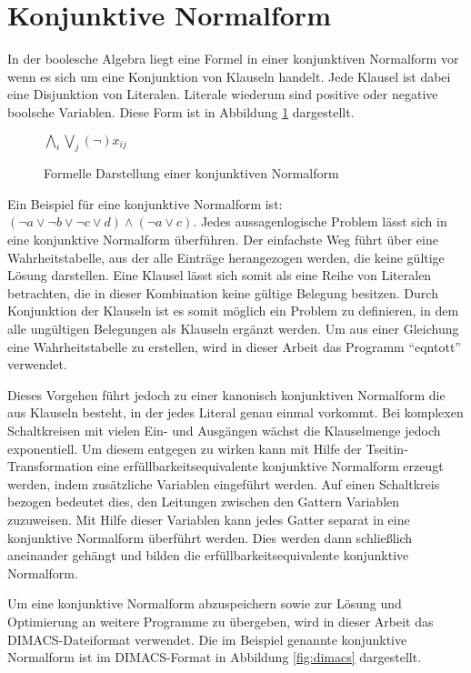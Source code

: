 \section{Konjunktive Normalform}
\label{sec:knf}


In der boolesche Algebra liegt eine Formel in einer konjunktiven Normalform vor wenn es sich um eine Konjunktion von Klauseln handelt.
Jede Klausel ist dabei eine Disjunktion von Literalen. Literale wiederum sind positive oder negative boolsche Variablen. Diese Form
ist in Abbildung \ref{fig:knf} dargestellt.

\begin{figure}[!h]
  \centering
  $ \bigwedge\limits_{i} \bigvee\limits_{j} (\neg)x_{ij} $
  \caption{Formelle Darstellung einer konjunktiven Normalform}
  \label{fig:knf}
\end{figure}

Ein Beispiel für eine konjunktive Normalform ist: $ (\neg a \vee \neg b \vee \neg c \vee d) \wedge (\neg a \vee c) $.
Jedes aussagenlogische Problem lässt sich in eine konjunktive Normalform überführen. Der einfachste Weg führt über
eine Wahrheitstabelle, aus der alle Einträge herangezogen werden, die keine gültige Lösung darstellen. Eine Klausel
lässt sich somit als eine Reihe von Literalen betrachten, die in dieser Kombination keine gültige Belegung besitzen.
Durch Konjunktion der Klauseln ist es somit möglich ein Problem zu definieren, in dem alle ungültigen Belegungen als
Klauseln ergänzt werden. Um aus einer Gleichung eine Wahrheitstabelle zu erstellen, wird in dieser Arbeit das Programm
"`eqntott"' verwendet.

Dieses Vorgehen führt jedoch zu einer kanonisch konjunktiven Normalform die aus Klauseln besteht, in der jedes Literal
genau einmal vorkommt. Bei komplexen Schaltkreisen mit vielen Ein- und Ausgängen wächst die Klauselmenge jedoch exponentiell.
Um diesem entgegen zu wirken kann mit Hilfe der Tseitin-Transformation \cite{wiki:tseitin} eine erfüllbarkeitsequivalente
konjunktive Normalform erzeugt werden, indem zusätzliche Variablen eingeführt werden. Auf einen Schaltkreis bezogen bedeutet
dies, den Leitungen zwischen den Gattern Variablen zuzuweisen. Mit Hilfe dieser Variablen kann jedes Gatter separat in eine
konjunktive Normalform überführt werden. Dies werden dann schließlich aneinander gehängt und bilden die erfüllbarkeitsequivalente
konjunktive Normalform.

Um eine konjunktive Normalform abzuspeichern sowie zur Lösung und Optimierung an weitere Programme zu übergeben, wird in dieser
Arbeit das DIMACS-Dateiformat verwendet. Die im Beispiel genannte konjunktive Normalform ist im DIMACS-Format in Abbildung
\ref{fig:dimacs} dargestellt.

